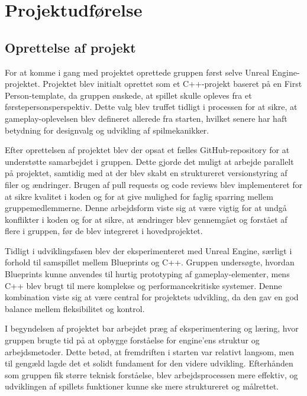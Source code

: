 \section{Projektudførelse}
\subsection{Oprettelse af projekt}
For at komme i gang med projektet oprettede gruppen først selve Unreal Engine-projektet. Projektet blev initialt oprettet som et C++-projekt baseret på en First Person-template, da gruppen ønskede, at spillet skulle opleves fra et førstepersonsperspektiv. Dette valg blev truffet tidligt i processen for at sikre, at gameplay-oplevelsen blev defineret allerede fra starten, hvilket senere har haft betydning for designvalg og udvikling af spilmekanikker.

Efter oprettelsen af projektet blev der opsat et fælles GitHub-repository for at understøtte samarbejdet i gruppen. Dette gjorde det muligt at arbejde parallelt på projektet, samtidig med at der blev skabt en struktureret versionstyring af filer og ændringer. Brugen af pull requests og code reviews blev implementeret for at sikre kvalitet i koden og for at give mulighed for faglig sparring mellem gruppemedlemmerne. Denne arbejdsform viste sig at være vigtig for at undgå konflikter i koden og for at sikre, at ændringer blev gennemgået og forstået af flere i gruppen, før de blev integreret i hovedprojektet.

Tidligt i udviklingsfasen blev der eksperimenteret med Unreal Engine, særligt i forhold til samspillet mellem Blueprints og C++. Gruppen undersøgte, hvordan Blueprints kunne anvendes til hurtig prototyping af gameplay-elementer, mens C++ blev brugt til mere komplekse og performancekritiske systemer. Denne kombination viste sig at være central for projektets udvikling, da den gav en god balance mellem fleksibilitet og kontrol.

I begyndelsen af projektet bar arbejdet præg af eksperimentering og læring, hvor gruppen brugte tid på at opbygge forståelse for engine’ens struktur og arbejdsmetoder. Dette betød, at fremdriften i starten var relativt langsom, men til gengæld lagde det et solidt fundament for den videre udvikling. Efterhånden som gruppen fik større teknisk forståelse, blev arbejdsprocessen mere effektiv, og udviklingen af spillets funktioner kunne ske mere struktureret og målrettet.

\newpage
